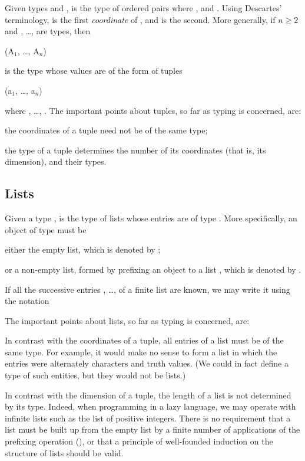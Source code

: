 Given types  and ,  is the type of ordered pairs  where , and
. Using Descartes' terminology,  is the first \textit{coordinate} of , and  is
the second. More generally, if $n \geq 2$ and , \ldots ,  are types, then
\begin{mlcoded}
    (A$_1$, \ldots, A$_n$)
\end{mlcoded}
is the type whose values are of the form of tuples
\begin{mlcoded}
(a$_1$, \ldots, a$_n$)
\end{mlcoded}
where , \ldots, . The important points about tuples, so far as typing is
concerned, are:
\begin{numbered}
    \item the coordinates of a tuple need not be of the same type;
    \item the type of a tuple determines the number of its coordinates (that is, its
    dimension), and their types.
\end{numbered}


\subsection{Lists}

Given a type , \ml{[B]} is the type of lists whose entries are of type . More
specifically, an object of type \ml{[B]} must be
\begin{numbered}
    \item either the empty list, which is denoted by \ml{[\,]};
    \item or a non-empty list, formed by prefixing an object  to a list ,
    which is denoted by .
\end{numbered}
If all the successive entries , \ldots,  of a finite list are known, we may write
it using the notation
\begin{mlcoded}
[b$_1$, \ldots, b$_k$]
\end{mlcoded}
The important points about lists, so far as typing is concerned, are:
\begin{numbered}
    \item In contrast with the coordinates of a tuple, all entries of a list must be of
    the same type. For example, it would make no sense to form a list in which
    the entries were alternately characters and truth values. (We could in fact
    define a type of such entities, but they would not be lists.)
    \item In contrast with the dimension of a tuple, the length of a list is not
    determined by its type. Indeed, when programming in a lazy language,
    we may operate with infinite lists such as the list of positive integers.
    There is no requirement that a list must be built up from the empty list by
    a finite number of applications of the prefixing operation (), or that a
    principle of well-founded induction on the structure of lists should be valid.
\end{numbered}

